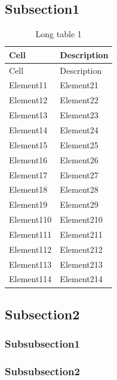\subsection{Subsection1}
\begin{longtable}[c]{| m{4.4cm} | m{11cm} |}
\caption{Long table 1}\\
 \hline

 Cell & Description  \\ 
 \hline
 \endfirsthead

 \hline
 
 Cell & Description  \\ 
 \hline
 \endhead

        \hline
          Element11 & Element21 \\
        \hline
          Element12 & Element22 \\
        \hline
          Element13 & Element23 \\
        \hline
          Element14 & Element24 \\
        \hline
          Element15 & Element25 \\
        \hline
          Element16 & Element26 \\
        \hline
          Element17 & Element27 \\
        \hline
          Element18 & Element28 \\
        \hline
          Element19 & Element29 \\
        \hline
          Element110 & Element210 \\
        \hline
          Element111 & Element211 \\
        \hline
          Element112 & Element212 \\
        \hline
          Element113 & Element213 \\
        \hline
          Element114 & Element214 \\
        \hline

 \end{longtable}

 
\subsection{Subsection2}

\subsubsection{Subsubsection1}

\subsubsection{Subsubsection2}

